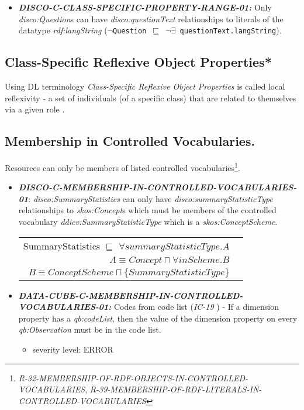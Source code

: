 \documentclass{llncs}
\newcommand{\ms}[1]{\texttt{#1}}
\newenvironment{DL}{
  \vspace{0cm}
  \begin{tabular}{r l}

}{
  \end{tabular}
}
\begin{document}
\begin{itemize}
	\item \textbf{{\em DISCO-C-CLASS-SPECIFIC-PROPERTY-RANGE-01:}} 
Only {\em disco:Question}s can have {\em disco:questionText} relationships to literals of the datatype {\em rdf:langString} (\ms{$\neg$Question $\sqsubseteq$ $\neg\exists$ questionText.langString}).
\end{itemize}

\subsection{Class-Specific Reflexive Object Properties*}

Using DL terminology \emph{Class-Specific Reflexive Object Properties} is called local reflexivity - a set of individuals (of a specific class) that are related to themselves via a given role \cite{Kroetzsch2012}.

\subsection{Membership in Controlled Vocabularies.}

Resources can only be members of listed controlled vocabularies\footnote{{\em R-32-MEMBERSHIP-OF-RDF-OBJECTS-IN-CONTROLLED-VOCABULARIES}, 
{\em R-39-MEMBERSHIP-OF-RDF-LITERALS-IN-CONTROLLED-VOCABULARIES}}.

\begin{itemize}
	\item \textbf{{\em DISCO-C-MEMBERSHIP-IN-CONTROLLED-VOCABULARIES-01}}:
{\em disco:SummaryStatistics} can only have {\em disco:summaryStatisticType} relationships to {\em skos:Concept}s which must be members of the controlled vocabulary {\em ddicv:SummaryStatisticType} which is a {\em skos:ConceptScheme}.

\begin{DL}
SummaryStatistics $\sqsubseteq$ $\forall summaryStatisticType.A$ \\
$A \equiv Concept \sqcap \forall inScheme . B$ \\
$B \equiv ConceptScheme \sqcap \{SummaryStatisticType\}$
\end{DL}
\end{itemize}

\begin{itemize}
	\item \textbf{{\em DATA-CUBE-C-MEMBERSHIP-IN-CONTROLLED-VOCABULARIES-01:}}
	Codes from code list (\emph{IC-19} \cite{CyganiakReynolds2014}) - 
	If a dimension property has a \emph{qb:codeList}, then the value of the dimension property on every \emph{qb:Observation} must be in the code list. 
	\begin{itemize}
		\item severity level: ERROR
	\end{itemize}
\end{itemize}
\end{document}
